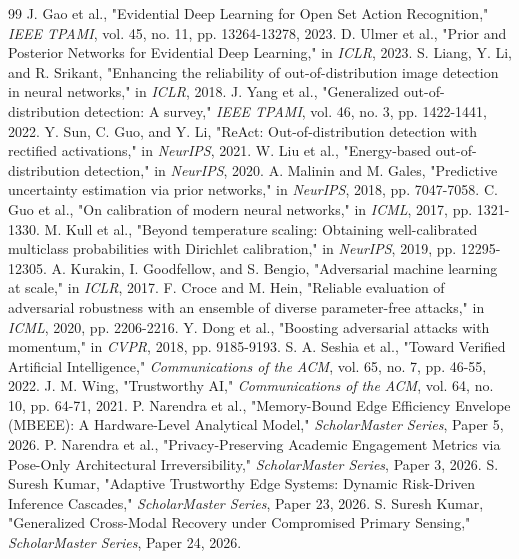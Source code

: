 \documentclass[conference]{IEEEtran}
\begin{document}
\begin{thebibliography}{99}
 J. Gao et al., "Evidential Deep Learning for Open Set Action Recognition," \textit{IEEE TPAMI}, vol. 45, no. 11, pp. 13264-13278, 2023.
 D. Ulmer et al., "Prior and Posterior Networks for Evidential Deep Learning," in \textit{ICLR}, 2023.
 S. Liang, Y. Li, and R. Srikant, "Enhancing the reliability of out-of-distribution image detection in neural networks," in \textit{ICLR}, 2018.
 J. Yang et al., "Generalized out-of-distribution detection: A survey," \textit{IEEE TPAMI}, vol. 46, no. 3, pp. 1422-1441, 2022.
 Y. Sun, C. Guo, and Y. Li, "ReAct: Out-of-distribution detection with rectified activations," in \textit{NeurIPS}, 2021.
 W. Liu et al., "Energy-based out-of-distribution detection," in \textit{NeurIPS}, 2020.
 A. Malinin and M. Gales, "Predictive uncertainty estimation via prior networks," in \textit{NeurIPS}, 2018, pp. 7047-7058.
 C. Guo et al., "On calibration of modern neural networks," in \textit{ICML}, 2017, pp. 1321-1330.
 M. Kull et al., "Beyond temperature scaling: Obtaining well-calibrated multiclass probabilities with Dirichlet calibration," in \textit{NeurIPS}, 2019, pp. 12295-12305.
 A. Kurakin, I. Goodfellow, and S. Bengio, "Adversarial machine learning at scale," in \textit{ICLR}, 2017.
 F. Croce and M. Hein, "Reliable evaluation of adversarial robustness with an ensemble of diverse parameter-free attacks," in \textit{ICML}, 2020, pp. 2206-2216.
 Y. Dong et al., "Boosting adversarial attacks with momentum," in \textit{CVPR}, 2018, pp. 9185-9193.
 S. A. Seshia et al., "Toward Verified Artificial Intelligence," \textit{Communications of the ACM}, vol. 65, no. 7, pp. 46-55, 2022.
 J. M. Wing, "Trustworthy AI," \textit{Communications of the ACM}, vol. 64, no. 10, pp. 64-71, 2021.
 P. Narendra et al., "Memory-Bound Edge Efficiency Envelope (MBEEE): A Hardware-Level Analytical Model," \textit{ScholarMaster Series}, Paper 5, 2026.
 P. Narendra et al., "Privacy-Preserving Academic Engagement Metrics via Pose-Only Architectural Irreversibility," \textit{ScholarMaster Series}, Paper 3, 2026.
 S. Suresh Kumar, "Adaptive Trustworthy Edge Systems: Dynamic Risk-Driven Inference Cascades," \textit{ScholarMaster Series}, Paper 23, 2026.
 S. Suresh Kumar, "Generalized Cross-Modal Recovery under Compromised Primary Sensing," \textit{ScholarMaster Series}, Paper 24, 2026.
\end{thebibliography}
\end{document}
